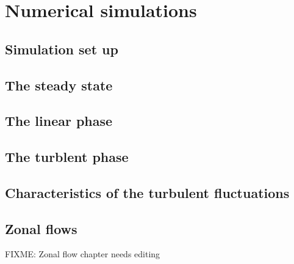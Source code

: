 \documentclass[12pt,a4paper,oneside,openright]{report} %
\title{\thesisTitle}
\author{\authorName}
\date{\thesisDate}
\begin{document}
%
\cleardoublepage
\clearpage



\cleardoublepage
\clearpage
{} %


\cleardoublepage
\clearpage
{} %

\setcounter{page}{4}

\cleardoublepage
\clearpage

\setcounter{page}{5}
\tableofcontents

\cleardoublepage
\clearpage


\part{Numerical simulations}
\label{part:results}
\chapter{Simulation set up}
\label{chap:setup}

\chapter{The steady state}
\label{chap:ss}

\chapter{The linear phase}
\label{chap:linear}

\chapter{The turblent phase}
\label{chap:satTurb}

\chapter{Characteristics of the turbulent fluctuations}
\label{chap:charTurb}



\chapter{Zonal flows}
\label{chap:zonal}
FIXME: Zonal flow chapter needs editing

\end{document}
